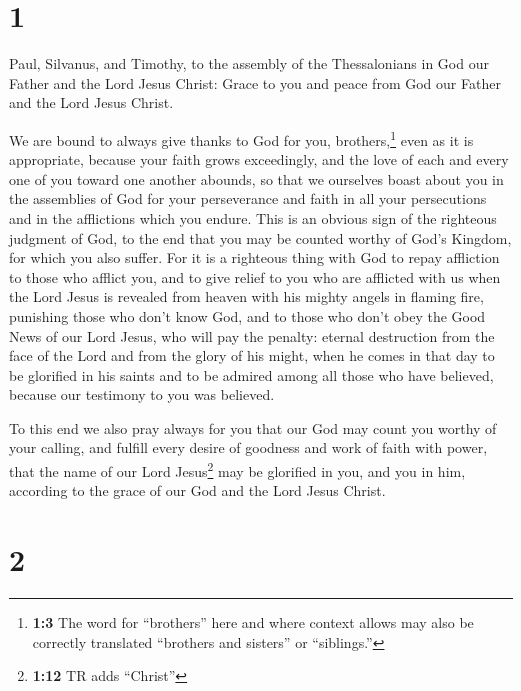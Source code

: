 \hypertarget{section}{%
\section{1}\label{section}}

 Paul, Silvanus, and Timothy, to the assembly of the
Thessalonians in God our Father and the Lord Jesus Christ:
 Grace to you and peace from God our Father and the Lord
Jesus Christ.

 We are bound to always give thanks to God for you,
brothers,\footnote{\textbf{1:3} The word for ``brothers'' here and where
  context allows may also be correctly translated ``brothers and
  sisters'' or ``siblings.''} even as it is appropriate, because your
faith grows exceedingly, and the love of each and every one of you
toward one another abounds,  so that we ourselves boast
about you in the assemblies of God for your perseverance and faith in
all your persecutions and in the afflictions which you endure.
 This is an obvious sign of the righteous judgment of God,
to the end that you may be counted worthy of God's Kingdom, for which
you also suffer.  For it is a righteous thing with God to
repay affliction to those who afflict you,  and to give
relief to you who are afflicted with us when the Lord Jesus is revealed
from heaven with his mighty angels in flaming fire, 
punishing those who don't know God, and to those who don't obey the Good
News of our Lord Jesus,  who will pay the penalty: eternal
destruction from the face of the Lord and from the glory of his might,
 when he comes in that day to be glorified in his saints
and to be admired among all those who have believed, because our
testimony to you was believed.

 To this end we also pray always for you that our God may
count you worthy of your calling, and fulfill every desire of goodness
and work of faith with power,  that the name of our Lord
Jesus\footnote{\textbf{1:12} TR adds ``Christ''} may be glorified in
you, and you in him, according to the grace of our God and the Lord
Jesus Christ.

\hypertarget{section-1}{%
\section{2}\label{section-1}}


